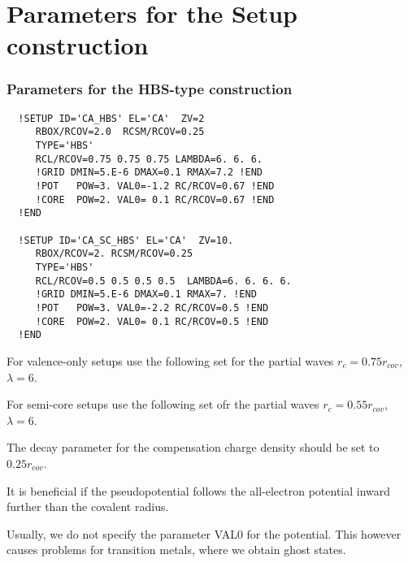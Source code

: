 \documentclass[11pt,a4paper]{report}
\begin{document}
\chapter{Parameters for the Setup construction}
\subsection{Parameters for the HBS-type construction}
\begin{verbatim}
  !SETUP ID='CA_HBS' EL='CA'  ZV=2   
     RBOX/RCOV=2.0  RCSM/RCOV=0.25     
     TYPE='HBS' 
     RCL/RCOV=0.75 0.75 0.75 LAMBDA=6. 6. 6. 
     !GRID DMIN=5.E-6 DMAX=0.1 RMAX=7.2 !END
     !POT   POW=3. VAL0=-1.2 RC/RCOV=0.67 !END
     !CORE  POW=2. VAL0= 0.1 RC/RCOV=0.67 !END
  !END

  !SETUP ID='CA_SC_HBS' EL='CA'  ZV=10.  
     RBOX/RCOV=2. RCSM/RCOV=0.25 
     TYPE='HBS'
     RCL/RCOV=0.5 0.5 0.5 0.5  LAMBDA=6. 6. 6. 6.
     !GRID DMIN=5.E-6 DMAX=0.1 RMAX=7. !END
     !POT   POW=3. VAL0=-2.2 RC/RCOV=0.5 !END
     !CORE  POW=2. VAL0= 0.1 RC/RCOV=0.5 !END
  !END
\end{verbatim}

For valence-only setups use the following set for the partial waves
$r_c=0.75 r_{cov}$, $\lambda=6$.

For semi-core setups use the following set ofr the partial waves
$r_c=0.55 r_{cov}$, $\lambda=6$.

The decay parameter for the compensation charge density should be set
to $0.25 r_{cov}$.

It is beneficial if the pseudopotential follows the all-electron
potential inward further than the covalent radius.

Usually, we do not specify the parameter VAL0 for the potential. This
however causes problems for transition metals, where we obtain ghost
states.


\printindex


\end{document}
